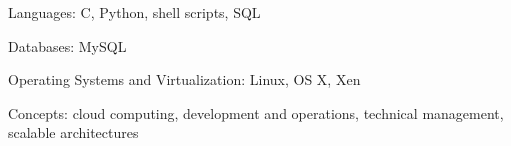 \documentclass[10pt,letterpaper]{article}
\newenvironment{indentsection}[1]%
{\begin{list}{}%
	{\setlength{\leftmargin}{#1}}%
	\item[]%
}
{\end{list}}
\begin{document}
\begin{indentsection}{\parindent}
	\begin{description*}
		\item[Languages:]
		C, Python, shell scripts, SQL
		\item[Databases:]
		MySQL
		\item[Operating Systems and Virtualization:]
		Linux, OS X, Xen
		\item[Concepts:]
		cloud computing, development and operations, technical management, scalable architectures	
	\end{description*}
\end{indentsection}
\end{document}
